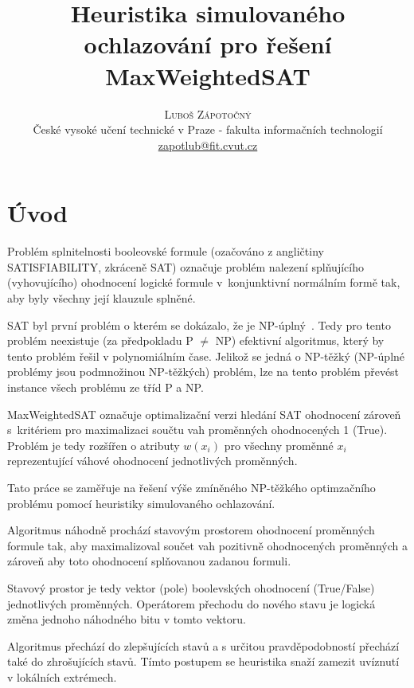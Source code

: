 \documentclass[twoside,twocolumn]{article}
\title{Heuristika simulovaného ochlazování pro řešení MaxWeightedSAT} %
\author{%
    \textsc{Luboš Zápotočný}\\[1ex] %
    \normalsize České vysoké učení technické v Praze - fakulta informačních technologií \\ %
    \normalsize \href{mailto:zapotlub@fit.cvut.cz}{zapotlub@fit.cvut.cz} %
}
\date{} %
\begin{document}
    \maketitle



    \section{Úvod}

    Problém splnitelnosti booleovské formule (ozačováno z angličtiny SATISFIABILITY, zkráceně SAT) označuje problém
    nalezení splňujícího (vyhovujícího) ohodnocení logické formule v~konjunktivní normálním formě tak, aby byly všechny její
    klauzule splněné.

    SAT byl první problém o kterém se dokázalo, že je NP-úplný~\cite{CookLevin1971}.
    Tedy pro tento problém neexistuje (za předpokladu P $\neq$ NP) efektivní algoritmus, který by tento problém řešil v polynomiálním čase.
    Jelikož se jedná o NP-těžký (NP-úplné problémy jsou podmnožinou NP-těžkých) problém, lze na tento problém převést instance všech problému ze tříd P a NP.

    MaxWeightedSAT označuje optimalizační verzi hledání SAT ohodnocení zároveň s~kritériem pro maximalizaci součtu
    vah proměnných ohodnocených 1 (True).
    Problém je tedy rozšířen o atributy $w(x_i)$ pro všechny proměnné $x_i$ reprezentující váhové ohodnocení jednotlivých
    proměnných.

    Tato práce se zaměřuje na řešení výše zmíněného NP-těžkého optimzačního problému pomocí heuristiky simulovaného ochlazování.

    Algoritmus náhodně prochází stavovým prostorem ohodnocení proměnných formule tak, aby maximalizoval součet vah pozitivně
    ohodnocených proměnných a zároveň aby toto ohodnocení splňovanou zadanou formuli.

    Stavový prostor je tedy vektor (pole) boolevských ohodnocení (True/False) jednotlivých proměnných.
    Operátorem přechodu do nového stavu je logická změna jednoho náhodného bitu v tomto vektoru.

    Algoritmus přechází do zlepšujících stavů a s určitou pravděpodobností přechází také do zhrošujících stavů.
    Tímto postupem se heuristika snaží zamezit uvíznutí v lokálních extrémech.
\end{document}
